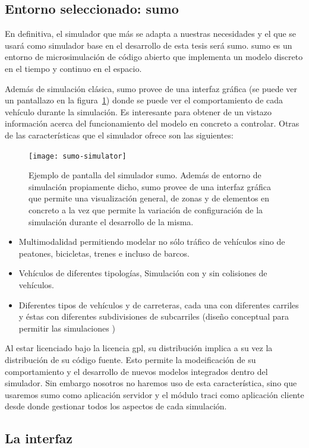 \subsection{Entorno seleccionado: \acrshort{sumo}}

En definitiva, el simulador que más se adapta a nuestras necesidades y el que se usará como simulador base en el desarrollo de esta tesis será \gls{sumo}. \gls{sumo} es un entorno de microsimulación de código abierto que implementa un modelo discreto en el tiempo y continuo en el espacio.

Además de simulación clásica, \gls{sumo} provee de una interfaz gráfica (se puede ver un pantallazo en la figura~\ref{fig:sumo-simulator}) donde se puede ver el comportamiento de cada vehículo durante la simulación. Es interesante para obtener de un vistazo información acerca del funcionamiento del modelo en concreto a controlar. Otras de las características que el simulador ofrece son las siguientes:

\begin{figure}
	\texttt{[image: sumo-simulator]}
	\caption{Ejemplo de pantalla del simulador \gls{sumo}. Además de entorno de simulación propiamente dicho, \gls{sumo} provee de una interfaz gráfica que permite una visualización general, de zonas y de elementos en concreto a la vez que permite la variación de configuración de la simulación durante el desarrollo de la misma.}
	\label{fig:sumo-simulator}
\end{figure}

\begin{itemize}
	\item Multimodalidad permitiendo modelar no sólo tráfico de vehículos sino de peatones, bicicletas, trenes e incluso de barcos.
	\item Vehículos de diferentes tipologías, Simulación con y sin colisiones de vehículos.
	\item Diferentes tipos de vehículos y de carreteras, cada una con diferentes carriles y éstas con diferentes subdivisiones de subcarriles (diseño conceptual para permitir las simulaciones )
\end{itemize}

Al estar licenciado bajo la licencia \gls{gpl}, su distribución implica a su vez la distribución de su código fuente. Esto permite la modeificación de su comportamiento y el desarrollo de nuevos modelos integrados dentro del simulador. Sin embargo nosotros no haremos uso de esta característica, sino que usaremos \gls{sumo} como aplicación servidor y el módulo \gls{traci} como aplicación cliente desde donde gestionar todos los aspectos de cada simulación.

\subsection{La interfaz }